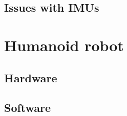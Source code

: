 \subsection{Issues with IMUs} \label{appendix:imus:issues}


\section{Humanoid robot}  \label{appendix:nao}
\subsection{Hardware}
\subsection{Software}



